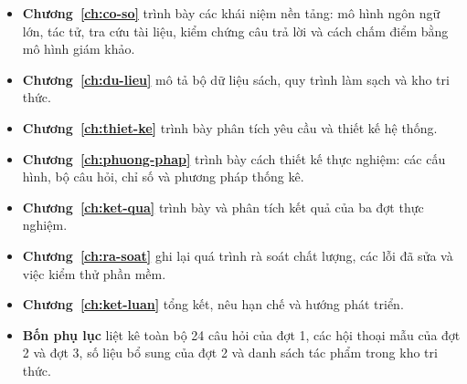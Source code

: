 \begin{itemize}
    \item \textbf{Chương~\ref{ch:co-so}} trình bày các khái niệm nền tảng: mô hình ngôn ngữ lớn, tác tử, tra cứu tài liệu, kiểm chứng câu trả lời và cách chấm điểm bằng mô hình giám khảo.
    \item \textbf{Chương~\ref{ch:du-lieu}} mô tả bộ dữ liệu sách, quy trình làm sạch và kho tri thức.
    \item \textbf{Chương~\ref{ch:thiet-ke}} trình bày phân tích yêu cầu và thiết kế hệ thống.
    \item \textbf{Chương~\ref{ch:phuong-phap}} trình bày cách thiết kế thực nghiệm: các cấu hình, bộ câu hỏi, chỉ số và phương pháp thống kê.
    \item \textbf{Chương~\ref{ch:ket-qua}} trình bày và phân tích kết quả của ba đợt thực nghiệm.
    \item \textbf{Chương~\ref{ch:ra-soat}} ghi lại quá trình rà soát chất lượng, các lỗi đã sửa và việc kiểm thử phần mềm.
    \item \textbf{Chương~\ref{ch:ket-luan}} tổng kết, nêu hạn chế và hướng phát triển.
    \item \textbf{Bốn phụ lục} liệt kê toàn bộ 24 câu hỏi của đợt 1, các hội thoại mẫu của đợt 2 và đợt 3, số liệu bổ sung của đợt 2 và danh sách tác phẩm trong kho tri thức.
\end{itemize}
